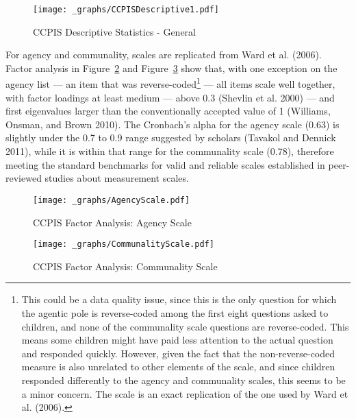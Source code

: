\documentclass[
  letterpaper,
  DIV=11,
  numbers=noendperiod]{scrreprt}
\begin{document}
\begin{figure}

{\centering \texttt{[image: \_graphs/CCPISDescriptive1.pdf]}

}

\caption{\label{fig-ccpis1}CCPIS Descriptive Statistics - General}

\end{figure}

For agency and communality, scales are replicated from Ward et al.
(2006). Factor analysis in Figure~\ref{fig-factor1} and
Figure~\ref{fig-factor2} show that, with one exception on the agency
list --- an item that was reverse-coded\footnote{This could be a data
  quality issue, since this is the only question for which the agentic
  pole is reverse-coded among the first eight questions asked to
  children, and none of the communality scale questions are
  reverse-coded. This means some children might have paid less attention
  to the actual question and responded quickly. However, given the fact
  that the non-reverse-coded measure is also unrelated to other elements
  of the scale, and since children responded differently to the agency
  and communality scales, this seems to be a minor concern. The scale is
  an exact replication of the one used by Ward et al. (2006).} --- all
items scale well together, with factor loadings at least medium ---
above 0.3 (Shevlin et al. 2000) --- and first eigenvalues larger than
the conventionally accepted value of 1 (Williams, Onsman, and Brown
2010). The Cronbach's alpha for the agency scale (0.63) is slightly
under the 0.7 to 0.9 range suggested by scholars (Tavakol and Dennick
2011), while it is within that range for the communality scale (0.78),
therefore meeting the standard benchmarks for valid and reliable scales
established in peer-reviewed studies about measurement scales.

\begin{figure}

{\centering \texttt{[image: \_graphs/AgencyScale.pdf]}

}

\caption{\label{fig-factor1}CCPIS Factor Analysis: Agency Scale}

\end{figure}

\begin{figure}

{\centering \texttt{[image: \_graphs/CommunalityScale.pdf]}

}

\caption{\label{fig-factor2}CCPIS Factor Analysis: Communality Scale}

\end{figure}
\end{document}
